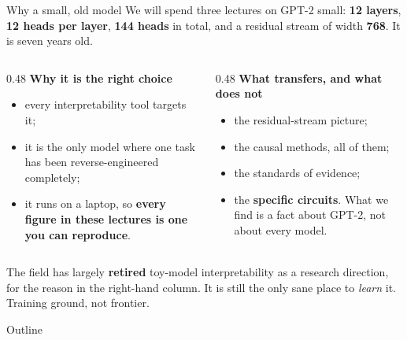 \documentclass[aspectratio=169]{beamer}
\newcommand{\watchbox}[1]{%
  \begin{tcolorbox}[colback=armorange!12, colframe=armorange, boxrule=0.6pt, arc=2pt]
  #1
  \end{tcolorbox}}
\begin{document}
\begin{frame}{Why a small, old model}
  \vspace{0.4em}
  We will spend three lectures on GPT-2 small: \textbf{12 layers}, \textbf{12 heads per layer},
  \textbf{144 heads} in total, and a residual stream of width \textbf{768}. It is seven years old.

  \vspace{0.8em}
  \begin{columns}[T]
    \begin{column}{0.48\textwidth}
      \textbf{Why it is the right choice}
      \begin{itemize}\small
        \item every interpretability tool targets it;
        \item it is the only model where one task has been reverse-engineered completely;
        \item it runs on a laptop, so \textbf{every figure in these lectures is one you can
              reproduce}.
      \end{itemize}
    \end{column}
    \begin{column}{0.48\textwidth}
      \textbf{What transfers, and what does not}
      \begin{itemize}\small
        \item[\textcolor{paramgreen}{\ding{51}}] the residual-stream picture;
        \item[\textcolor{paramgreen}{\ding{51}}] the causal methods, all of them;
        \item[\textcolor{paramgreen}{\ding{51}}] the standards of evidence;
        \item[\textcolor{armred}{\ding{55}}] the \textbf{specific circuits}. What we find is a
              fact about GPT-2, not about every model.
      \end{itemize}
    \end{column}
  \end{columns}

  \vspace{0.4em}
  \watchbox{\small The field has largely \textbf{retired} toy-model interpretability as a research
  direction, for the reason in the right-hand column. It is still the only sane place to
  \emph{learn} it. Training ground, not frontier.}
\end{frame}

\begin{frame}{Outline}
  \tableofcontents
\end{frame}
\end{document}
